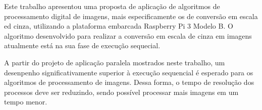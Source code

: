 Este trabalho apresentou uma proposta de aplicação de algoritmos de
processamento digital de imagens, mais especificamente os de conversão em escala
ed cinza, utilizando a plataforma embarcada Raspberry Pi 3 Modelo B. O algoritmo
desenvolvido para realizar a conversão em escala de cinza em imagens atualmente
está na sua fase de execução sequecial.

A partir do projeto de aplicação paralela mostrados neste trabalho, um
desenpenho significativamente superior à execução sequencial é esperado para os
algoritmos de processamento de imagens. Dessa forma, o tempo de resolução dos
processos deve ser reduzindo, sendo possível processar mais imagens em um tempo
menor.  
